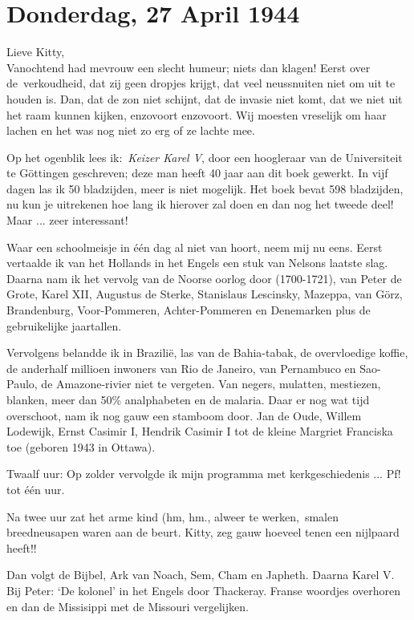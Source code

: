 \documentclass{book}
\begin{document}
\section*{Donderdag, 27 April 1944}

Lieve Kitty,\\
Vanochtend had mevrouw een slecht humeur; niets dan klagen! Eerst
over de~verkoudheid, dat zij geen dropjes krijgt, dat veel neussnuiten niet om
uit te houden is. Dan, dat de zon niet schijnt, dat de invasie niet komt, dat we
niet uit het raam kunnen kijken, enzovoort enzovoort. Wij moesten vreselijk om
haar lachen en het was nog niet zo erg of ze lachte mee.

Op het ogenblik lees ik:~\emph{Keizer Karel V}, door een hoogleraar van de
Universiteit te Göttingen geschreven; deze man heeft 40 jaar aan dit boek
gewerkt. In vijf dagen las ik 50 bladzijden, meer is niet mogelijk.  Het boek
bevat 598 bladzijden, nu kun je uitrekenen hoe lang ik hierover zal doen en dan
nog het tweede deel! Maar ... zeer interessant!

Waar een schoolmeisje in één dag al niet van hoort, neem mij nu eens.  Eerst
vertaalde ik van het Hollands in het Engels een stuk van Nelsons laatste slag.
Daarna nam ik het vervolg van de Noorse oorlog door (1700-1721), van Peter de
Grote, Karel XII, Augustus de Sterke, Stanislaus Lescinsky, Mazeppa, van Görz,
Brandenburg, Voor-Pommeren, Achter-Pommeren en Denemarken plus de gebruikelijke
jaartallen.

Vervolgens belandde ik in Brazilië, las van de Bahia-tabak, de overvloedige
koffie, de anderhalf millioen inwoners van Rio de Janeiro, van Pernambuco en
Sao-Paulo, de Amazone-rivier niet te vergeten. Van negers, mulatten, mestiezen,
blanken, meer dan 50\% analphabeten en de malaria. Daar er nog wat tijd
overschoot, nam ik nog gauw een stamboom door. Jan de Oude, Willem Lodewijk,
Ernst Casimir I, Hendrik Casimir I tot de kleine Margriet Franciska toe (geboren
1943 in Ottawa).

Twaalf uur: Op zolder vervolgde ik mijn programma met kerkgeschiedenis ... Pf!
tot één uur.

Na twee uur zat het arme kind (hm, hm., alweer te werken,~smalen breedneusapen
waren aan de beurt. Kitty, zeg gauw hoeveel tenen een nijlpaard heeft!!

Dan volgt de Bijbel, Ark van Noach, Sem, Cham en Japheth. Daarna Karel V. Bij
Peter: `De kolonel' in het Engels door Thackeray. Franse woordjes overhoren en
dan de Missisippi met de Missouri vergelijken.
\end{document}
